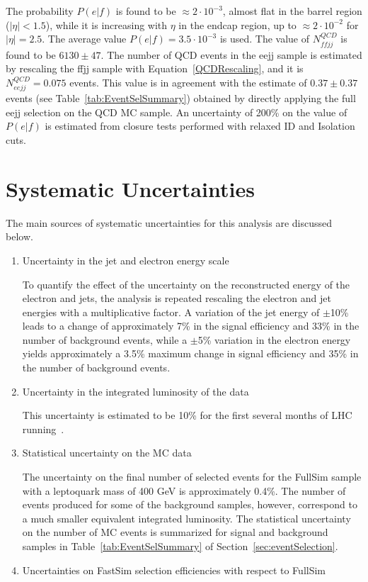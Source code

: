 \documentclass{cmspaper}
\begin{document}
\begin{linenumbers}
The probability $P(e|f)$ is found to be $\approx 2 \cdot 10^{-3}$, almost flat in the barrel region ($|\eta|<1.5$), while 
it is increasing with $\eta$ in the endcap region, up to $\approx 2 \cdot 10^{-2}$ for $|\eta|=2.5$. 
The average value $P(e|f) = 3.5 \cdot 10^{-3}$ is used.
The value of $N_{ffjj}^{QCD}$ is found to be $6130 \pm 47$. The number of QCD events in the eejj sample is estimated 
by rescaling the ffjj sample with Equation~\ref{QCDRescaling}, and it is $N_{eejj}^{QCD}=0.075$ events.
This value is in agreement with the estimate of $0.37 \pm 0.37$ events 
(see Table~\ref{tab:EventSelSummary}) obtained by directly applying the full eejj 
selection on the QCD MC sample. An uncertainty of 200\% on the value of $P(e|f)$ is estimated 
from closure tests performed with relaxed ID and Isolation cuts. 

\section{Systematic Uncertainties} \label{sec:Systematics}

The main sources of systematic uncertainties for this analysis are discussed below.

%
\begin{enumerate}
\item Uncertainty in the jet and electron energy scale

To quantify the effect of the uncertainty on the reconstructed energy of the electron and jets,
the analysis is repeated rescaling the electron and jet energies
 with a multiplicative factor. 
A variation of the jet energy of $\pm$10\% leads to a change of approximately 
7\% in the signal efficiency and 33\% in the number of background events, 
while a $\pm$5\% variation in the electron energy yields approximately a 3.5\% maximum 
change in signal efficiency and 35\% in the number of background events. 
%
\item Uncertainty in the integrated luminosity of the data

This uncertainty is estimated to be 10\% for the first several months of LHC running~\cite{PTDR}. 
%
\item Statistical uncertainty on the MC data

The uncertainty on the final number of selected events for the FullSim sample with a leptoquark mass of 400 GeV is 
approximately 0.4\%.  The number of events produced 
for some of the background samples, however, correspond to a much
smaller equivalent integrated luminosity.  
The statistical uncertainty on the number of MC events is summarized for signal and background samples 
in Table~\ref{tab:EventSelSummary} of Section~\ref{sec:eventSelection}.  
%
\item Uncertainties on FastSim selection efficiencies with respect to FullSim


\end{enumerate}
\end{linenumbers}
\end{document}

